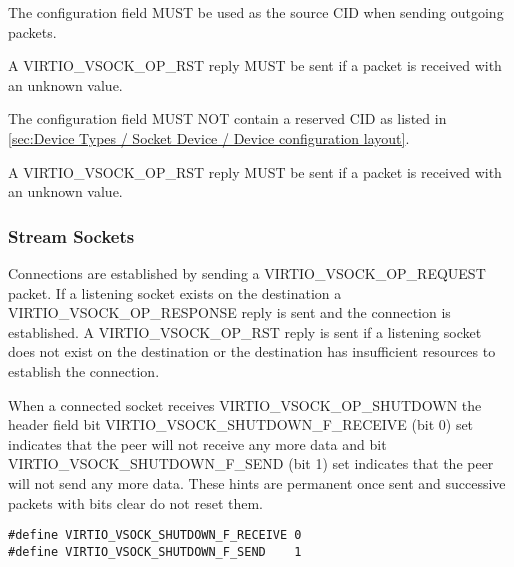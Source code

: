 
The  configuration field MUST be used as the source CID when
sending outgoing packets.

A VIRTIO_VSOCK_OP_RST reply MUST be sent if a packet is received with an
unknown  value.


The  configuration field MUST NOT contain a reserved CID as listed in \ref{sec:Device Types / Socket Device / Device configuration layout}.

A VIRTIO_VSOCK_OP_RST reply MUST be sent if a packet is received with an
unknown  value.

\subsubsection{Stream Sockets}\label{sec:Device Types / Socket Device / Device Operation / Stream Sockets}

Connections are established by sending a VIRTIO_VSOCK_OP_REQUEST packet. If a
listening socket exists on the destination a VIRTIO_VSOCK_OP_RESPONSE reply is
sent and the connection is established.  A VIRTIO_VSOCK_OP_RST reply is sent if
a listening socket does not exist on the destination or the destination has
insufficient resources to establish the connection.

When a connected socket receives VIRTIO_VSOCK_OP_SHUTDOWN the header
 field bit VIRTIO_VSOCK_SHUTDOWN_F_RECEIVE (bit 0) set indicates
that the peer will not receive any more data and bit VIRTIO_VSOCK_SHUTDOWN_F_SEND
(bit 1) set indicates that the peer will not send any more data.  These hints are
permanent once sent and successive packets with bits clear do not reset them.

\begin{lstlisting}
#define VIRTIO_VSOCK_SHUTDOWN_F_RECEIVE 0
#define VIRTIO_VSOCK_SHUTDOWN_F_SEND    1
\end{lstlisting}

